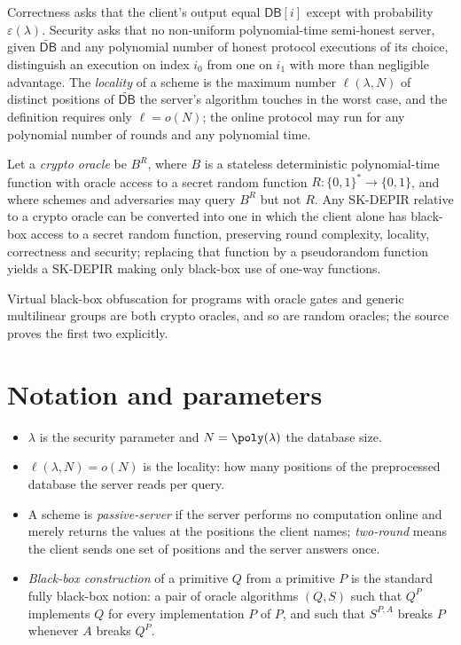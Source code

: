 \documentclass{conjura-conjecture}
\newcommand{\bits}{\{0,1\}}
\newcommand{\DB}{\mathsf{DB}}
\newcommand{\pDB}{\widetilde{\mathsf{DB}}}
\begin{document}
Correctness asks that the client's output equal $\DB[i]$ except with
probability $\varepsilon(\lambda)$. Security asks that no non-uniform
polynomial-time semi-honest server, given $\pDB$ and any polynomial
number of honest protocol executions of its choice, distinguish an
execution on index $i_0$ from one on $i_1$ with more than negligible
advantage. The \emph{locality} of a scheme is the maximum number
$\ell(\lambda,N)$ of distinct positions of $\pDB$ the server's algorithm
touches in the worst case, and the definition requires only
$\ell = o(N)$; the online protocol may run for any polynomial number of
rounds and any polynomial time.

\begin{theorem}\label{thm:main}
Let a \emph{crypto oracle} be $B^{R}$, where $B$ is a stateless
deterministic polynomial-time function with oracle access to a secret
random function $R : \bits^{*} \to \bits$, and where schemes and
adversaries may query $B^{R}$ but not $R$. Any SK-DEPIR relative to a
crypto oracle can be converted into one in which the client alone has
black-box access to a secret random function, preserving round
complexity, locality, correctness and security; replacing that function
by a pseudorandom function yields a SK-DEPIR making only black-box use of
one-way functions.
\end{theorem}

Virtual black-box obfuscation for programs with oracle gates and generic
multilinear groups are both crypto oracles, and so are random oracles;
the source proves the first two explicitly.

\section{Notation and parameters}\label{sec:notation}

\begin{itemize}[nosep]
  \item $\lambda$ is the security parameter and $N = \poly(\lambda)$ the
    database size.
  \item $\ell(\lambda,N) = o(N)$ is the locality: how many positions of
    the preprocessed database the server reads per query.
  \item A scheme is \emph{passive-server} if the server performs no
    computation online and merely returns the values at the positions the
    client names; \emph{two-round} means the client sends one set of
    positions and the server answers once.
  \item \emph{Black-box construction} of a primitive $Q$ from a primitive
    $P$ is the standard fully black-box notion: a pair of oracle
    algorithms $(Q,S)$ such that $Q^{P}$ implements $Q$ for every
    implementation $P$ of $P$, and such that $S^{P,A}$ breaks $P$
    whenever $A$ breaks $Q^{P}$.
\end{itemize}
\end{document}
